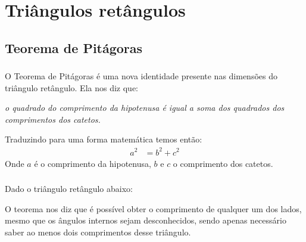 \documentclass[handout]{beamer}
\begin{document}
\section{Triângulos retângulos}
\subsection{Teorema de Pitágoras}
\begin{frame}[fragile]\frametitle{\subsecname}
O Teorema de Pitágoras é uma nova identidade presente nas dimensões do triângulo 
retângulo. Ela nos diz que:\\
\begin{alertblock}{}
    \textit{o quadrado do comprimento da hipotenusa é igual a soma dos 
    quadrados dos comprimentos dos catetos.}\\
\end{alertblock}
\begin{block}{Traduzindo para uma forma matemática temos então:}
    \begin{align*}
        a^2 &= b^2 + c^2
    \end{align*}
    Onde $a$ é o comprimento da hipotenusa, $b$ e $c$ o comprimento dos catetos.
\end{block}
\end{frame}

\begin{frame}[fragile]\frametitle{\subsecname}
    Dado o triângulo retângulo abaixo:
    \begin{figure}[H]
        \centering
    \end{figure}
    O teorema nos diz que é possível obter o comprimento de 
    qualquer um dos lados, mesmo que os ângulos internos sejam desconhecidos, sendo 
    apenas necessário saber ao menos dois comprimentos desse triângulo.
\end{frame}
\end{document}
